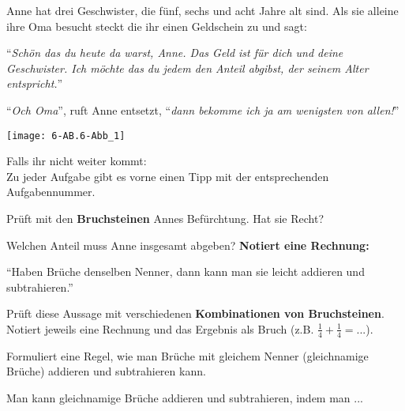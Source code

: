 \documentclass[11pt, a4paper, ngerman]{arbeitsblatt}
\begin{document}
\ReiheTitel

\medskip
\begin{minipage}{0.7\textwidth}
Anne hat drei Geschwister, die fünf, sechs und acht Jahre alt sind. Als sie
alleine ihre Oma besucht steckt die ihr einen Geldschein zu und sagt: \medskip

\enquote{\textit{Schön das du heute da warst, Anne. Das Geld ist für dich und deine
Geschwister. Ich möchte das du jedem den Anteil abgibst, der seinem Alter entspricht.}} \medskip

\enquote{\textit{Och Oma}}, ruft Anne entsetzt, \enquote{\textit{dann bekomme ich ja am wenigsten von allen!}}
\end{minipage}\hfill
\begin{minipage}{4cm}
	\texttt{[image: 6-AB.6-Abb\_1]}
\end{minipage}

\begin{center}\footnotesize
Falls ihr nicht weiter kommt:\\
Zu jeder Aufgabe gibt es vorne einen Tipp mit der entsprechenden Aufgabennummer.
\end{center}

\begin{aufgabe}
	Prüft mit den \textbf{Bruchsteinen} Annes Befürchtung. Hat sie Recht?
\end{aufgabe}
\medskip

\begin{aufgabe}
	Welchen Anteil muss Anne insgesamt abgeben? \textbf{Notiert eine Rechnung:}

\end{aufgabe}
\medskip

\begin{aufgabe}
	\enquote{Haben Brüche denselben Nenner, dann kann man sie leicht addieren und subtrahieren.}

	Prüft diese Aussage mit verschiedenen \textbf{Kombinationen von Bruchsteinen}. Notiert jeweils eine Rechnung und das Ergebnis als Bruch (z.B. $\frac{1}{4} + \frac{1}{4} = $...).

\end{aufgabe}
\medskip

\begin{aufgabe}
	Formuliert eine Regel, wie man Brüche mit gleichem Nenner (gleichnamige Brüche) addieren und subtrahieren kann.

	Man kann gleichnamige Brüche addieren und subtrahieren, indem man ...

\end{aufgabe}
\end{document}
